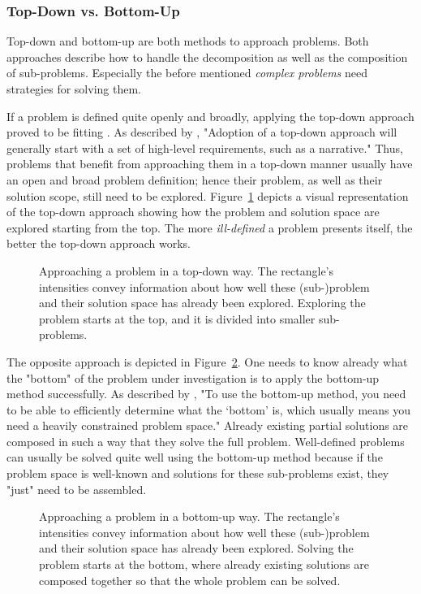\subsubsection{Top-Down vs. Bottom-Up}
Top-down and bottom-up are both methods to approach problems.
Both approaches describe how to handle the decomposition as well as the composition of sub-problems.
Especially the before mentioned \emph{complex problems} need strategies for solving them.

If a problem is defined quite openly and broadly, applying the top-down approach proved to be fitting \cite{kung_comparing_2013}.
As described by \citeauthor{kung_comparing_2013} \cite{kung_comparing_2013}, "Adoption of a top-down approach will generally start with a set of high-level requirements, such as a narrative."
Thus, problems that benefit from approaching them in a top-down manner usually have an open and broad problem definition; hence their problem, as well as their solution scope, still need to be explored.
Figure~\ref{fig:top-down} depicts a visual representation of the top-down approach showing how the problem and solution space are explored starting from the top.
The more \emph{ill-defined} a problem presents itself, the better the top-down approach works.
%
\begin{figure}
\centering
\hspace*{0.15\linewidth}

\caption{Approaching a problem in a top-down way. The rectangle's intensities convey information about how well these (sub-)problem and their solution space has already been explored. Exploring the problem starts at the top, and it is divided into smaller sub-problems.}
\label{fig:top-down}
\end{figure}

The opposite approach is depicted in Figure~\ref{fig:bottom-up}.
One needs to know already what the "bottom" of the problem under investigation is to apply the bottom-up method successfully.
As described by \citeauthor{jones_is_2011} \cite{jones_is_2011}, "To use the bottom-up method, you need to be able to efficiently determine what the `bottom' is, which usually means you need a heavily constrained problem space."
Already existing partial solutions are composed in such a way that they solve the full problem.
Well-defined problems can usually be solved quite well using the bottom-up method because if the problem space is well-known and solutions for these sub-problems exist, they "just" need to be assembled.
%
\begin{figure}
\centering
\hspace*{0.15\linewidth}

\caption{Approaching a problem in a bottom-up way. The rectangle's intensities convey information about how well these (sub-)problem and their solution space has already been explored. Solving the problem starts at the bottom, where already existing solutions are composed together so that the whole problem can be solved.}
\label{fig:bottom-up}
\end{figure}


